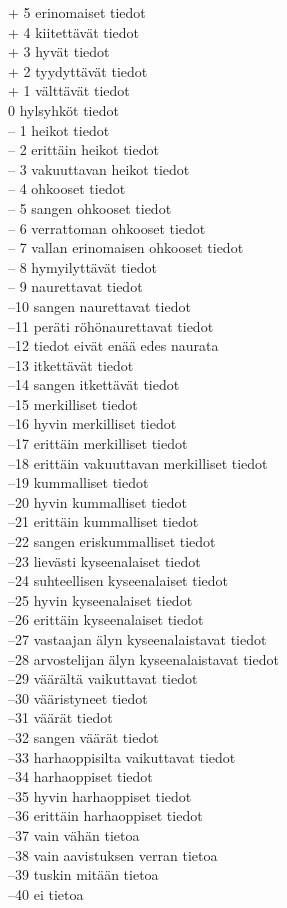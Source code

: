 \documentclass[a5paper, 8pt, twocolumn]{book} %
\numberwithin{equation}{section}
\begin{document}
\noindent+ 5 erinomaiset tiedot\\
+ 4 kiitettävät tiedot\\
+ 3 hyvät tiedot\\
+ 2 tyydyttävät tiedot\\
+ 1 välttävät tiedot\\
0 hylsyhköt tiedot\\
– 1 heikot tiedot\\
– 2 erittäin heikot tiedot\\
– 3 vakuuttavan heikot tiedot\\
– 4 ohkooset tiedot\\
– 5 sangen ohkooset tiedot\\
– 6 verrattoman ohkooset tiedot\\
– 7 vallan erinomaisen ohkooset tiedot\\
– 8 hymyilyttävät tiedot\\
– 9 naurettavat tiedot\\
–10 sangen naurettavat tiedot\\
–11 peräti röhönaurettavat tiedot\\
–12 tiedot eivät enää edes naurata\\
–13 itkettävät tiedot\\
–14 sangen itkettävät tiedot\\
–15 merkilliset tiedot\\
–16 hyvin merkilliset tiedot\\
–17 erittäin merkilliset tiedot\\
–18 erittäin vakuuttavan merkilliset tiedot\\
–19 kummalliset tiedot\\
–20 hyvin kummalliset tiedot\\
–21 erittäin kummalliset tiedot\\
–22 sangen eriskummalliset tiedot\\
–23 lievästi kyseenalaiset tiedot\\
–24 suhteellisen kyseenalaiset tiedot\\
–25 hyvin kyseenalaiset tiedot\\
–26 erittäin kyseenalaiset tiedot\\
–27 vastaajan älyn kyseenalaistavat tiedot\\
–28 arvostelijan älyn kyseenalaistavat
tiedot\\
–29 väärältä vaikuttavat tiedot\\
–30 vääristyneet tiedot\\
–31 väärät tiedot\\
–32 sangen väärät tiedot\\
–33 harhaoppisilta vaikuttavat tiedot\\
–34 harhaoppiset tiedot\\
–35 hyvin harhaoppiset tiedot\\
–36 erittäin harhaoppiset tiedot\\
–37 vain vähän tietoa\\
–38 vain aavistuksen verran tietoa\\
–39 tuskin mitään tietoa\\
–40 ei tietoa
\end{document}
